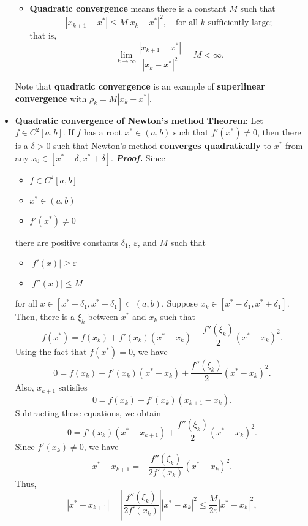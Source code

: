 \documentclass{report}
\begin{document}
\begin{itemize}
\begin{itemize}
        \item  \textbf{Quadratic convergence} means there is a constant \( M \) such that
        \[
            \left|x_{k+1}-x^*\right| \leq M \left|x_k - x^*\right|^2, \quad \text{for all } k \text{ sufficiently large};
        \]
        that is,
        \[
            \lim_{k \to \infty} \frac{\left|x_{k+1}-x^*\right|}{\left|x_k - x^*\right|^2} = M < \infty.
        \]
    \end{itemize}
Note that \textbf{quadratic convergence} is an example of \textbf{superlinear convergence} with \( \rho_k = M \left|x_k - x^*\right| \).
\item \textbf{Quadratic convergence of Newton's method}
    \bigbreak \noindent 
    \textbf{Theorem}: Let $f \in C^2[a,b]$. If $f$ has a root $x^* \in (a,b)$ such that $f'(x^*) \neq 0$, then there is a $\delta > 0$ such that Newton's method \textbf{converges quadratically} to $x^*$ from any $x_0 \in [x^*-\delta, x^*+\delta]$.
    \bigbreak \noindent 
    \textbf{\textit{Proof.}} 
    Since
    \begin{itemize}
        \item $f \in C^2[a,b]$ 
        \item $x^* \in (a,b)$
        \item $f'(x^*) \neq 0$
    \end{itemize}
    there are positive constants $\delta_1$, $\varepsilon$, and $M$ such that
    \begin{itemize}
        \item $\left|f'(x)\right| \geq \varepsilon$ 
        \item $\left|f''(x)\right| \leq M$
    \end{itemize}
    for all $x \in [x^*-\delta_1, x^*+\delta_1] \subset (a,b)$.
    \bigbreak \noindent 
    Suppose $x_k \in [x^*-\delta_1, x^*+\delta_1]$. Then, there is a $\xi_k$ between $x^*$ and $x_k$ such that
    $$f(x^*) = f(x_k) + f'(x_k) (x^* - x_k) + \frac{f''(\xi_k)}{2} (x^* - x_k)^2.$$
    Using the fact that $f(x^*) = 0$, we have
    $$0 = f(x_k) + f'(x_k) (x^* - x_k) + \frac{f''(\xi_k)}{2} (x^* - x_k)^2.$$
    Also, $x_{k+1}$ satisfies
    $$0 = f(x_k) + f'(x_k) (x_{k+1} - x_k).$$
    Subtracting these equations, we obtain
    $$0 = f'(x_k) (x^* - x_{k+1}) + \frac{f''(\xi_k)}{2} (x^* - x_k)^2.$$
    \bigbreak \noindent 
    Since $f'(x_k) \ne 0$, we have 
    $$x^* - x_{k+1} = -\frac{f''(\xi_k)}{2f'(x_k)} (x^* - x_k)^2.$$
    Thus,
    $$\left|x^* - x_{k+1}\right| = \left|\frac{f''(\xi_k)}{2f'(x_k)}\right| \left|x^* - x_k\right|^2 \leq \frac{M}{2\varepsilon} \left|x^* - x_k\right|^2,$$

\end{itemize}
\end{document}
